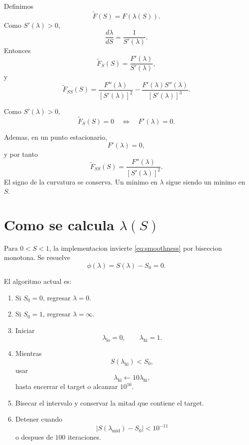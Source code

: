 \documentclass[11pt]{article}
\begin{document}
Definimos
\[
\widetilde F(S)=F(\lambda(S)).
\]
Como \(S'(\lambda)>0\),
\[
\frac{d\lambda}{dS}
=
\frac{1}{S'(\lambda)}.
\]
Entonces
\begin{equation}
\widetilde F_S(S)
=
\frac{F'(\lambda)}
{S'(\lambda)},
\label{eq:chain-first}
\end{equation}
y
\begin{equation}
\widetilde F_{SS}(S)
=
\frac{F''(\lambda)}
{[S'(\lambda)]^2}
-
\frac{
F'(\lambda)S''(\lambda)
}{
[S'(\lambda)]^3
}.
\label{eq:chain-second}
\end{equation}

Como \(S'(\lambda)>0\),
\begin{equation}
\widetilde F_S(S)=0
\quad\Longleftrightarrow\quad
F'(\lambda)=0.
\label{eq:stationary-equivalence}
\end{equation}

Ademas, en un punto estacionario,
\[
F'(\lambda)=0,
\]
y por tanto
\begin{equation}
\widetilde F_{SS}(S)
=
\frac{F''(\lambda)}
{[S'(\lambda)]^2}.
\label{eq:curvature-equivalence}
\end{equation}
El signo de la curvatura se conserva. Un minimo en \(\lambda\) sigue siendo un
minimo en \(S\).

\section{Como se calcula \(\lambda(S)\)}

Para \(0<S<1\), la implementacion invierte \eqref{eq:smoothness} por
biseccion monotona. Se resuelve
\begin{equation}
\phi(\lambda)
=
S(\lambda)-S_0
=
0.
\label{eq:inverse-problem}
\end{equation}

El algoritmo actual es:

\begin{enumerate}[leftmargin=2.4em]
    \item Si \(S_0=0\), regresar \(\lambda=0\).
    \item Si \(S_0=1\), regresar \(\lambda=\infty\).
    \item Iniciar
    \[
    \lambda_{\mathrm{lo}}=0,
    \qquad
    \lambda_{\mathrm{hi}}=1.
    \]
    \item Mientras
    \[
    S(\lambda_{\mathrm{hi}})<S_0,
    \]
    usar
    \[
    \lambda_{\mathrm{hi}}
    \leftarrow
    10\lambda_{\mathrm{hi}},
    \]
    hasta encerrar el target o alcanzar \(10^{16}\).
    \item Bisecar el intervalo y conservar la mitad que contiene el target.
    \item Detener cuando
    \[
    |S(\lambda_{\mathrm{mid}})-S_0|<10^{-11}
    \]
    o despues de \(100\) iteraciones.
\end{enumerate}
\end{document}

